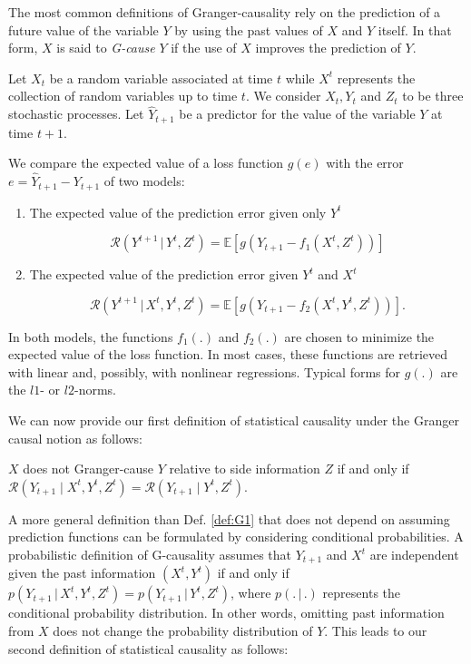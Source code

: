 \documentclass[]{book}
\providecommand{\tightlist}{%
  \setlength{\itemsep}{0pt}\setlength{\parskip}{0pt}}
\theoremstyle{definition}
\theoremstyle{definition}
\theoremstyle{definition}
\theoremstyle{remark}
\let\BeginKnitrBlock\begin \let\EndKnitrBlock\end
\begin{document}
The most common definitions of Granger-causality rely on the prediction
of a future value of the variable \(Y\) by using the past values of
\(X\) and \(Y\) itself. In that form, \(X\) is said to \emph{G-cause}
\(Y\) if the use of \(X\) improves the prediction of \(Y\).

Let \(X_t\) be a random variable associated at time \(t\) while \(X^t\)
represents the collection of random variables up to time \(t\). We
consider \({X_t}, {Y_t}\) and \({Z_t}\) to be three stochastic
processes. Let \(\hat Y_{t+1}\) be a predictor for the value of the
variable \(Y\) at time \(t+1\).

We compare the expected value of a loss function \(g(e)\) with the error
\(e=\hat{Y}_{t+1} - Y_{t+1}\) of two models:

\begin{enumerate}
\def\labelenumi{\arabic{enumi}.}
\tightlist
\item
  The expected value of the prediction error given only \(Y^t\)

  \begin{equation}
   \mathcal{R}(Y^{t+1} \, | \, Y^t,Z^t) = \mathbb{E}[g(Y_{t+1} - f_1(X^{t},Z^t))]
  \end{equation}
\item
  The expected value of the prediction error given \(Y^t\) and \(X^t\)

  \begin{equation}
   \mathcal{R}(Y^{t+1} \, | \, X^{t},Y^t,Z^t) = \mathbb{E}[g(Y_{t+1} - f_2(X^{t},Y^t,Z^t))].
  \end{equation}
\end{enumerate}

In both models, the functions \(f_1(.)\) and \(f_2(.)\) are chosen to
minimize the expected value of the loss function. In most cases, these
functions are retrieved with linear and, possibly, with nonlinear
regressions. Typical forms for \(g(.)\) are the \(l1\)- or \(l2\)-norms.

We can now provide our first definition of statistical causality under
the Granger causal notion as follows:

\BeginKnitrBlock{definition}
\protect\hypertarget{def:G1}{}{\label{def:G1} }\(X\) does not Granger-cause
\(Y\) relative to side information \(Z\) if and only if
\(\mathcal{R}(Y_{t+1} \; | \; X^t, Y^t, Z^t) = \mathcal{R}(Y_{t+1} \; | \; Y^t, Z^t)\).
\EndKnitrBlock{definition}

A more general definition than Def. \ref{def:G1} that does not depend on
assuming prediction functions can be formulated by considering
conditional probabilities. A probabilistic definition of G-causality
assumes that \(Y_{t+1}\) and \(X^{t}\) are independent given the past
information \((X^{t}, Y^{t})\) if and only if
\(p(Y_{t+1} \, | \, X^{t}, Y^{t}, Z^{t}) = p(Y_{t+1} \, | \, Y^{t}, Z^{t})\),
where \(p(. \, | \, .)\) represents the conditional probability
distribution. In other words, omitting past information from \(X\) does
not change the probability distribution of \(Y\). This leads to our
second definition of statistical causality as follows:
\end{document}
